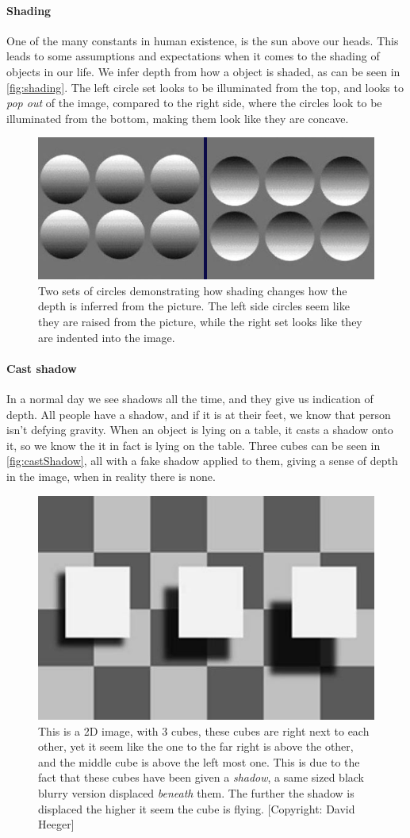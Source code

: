 			\paragraph{Shading}
				One of the many constants in human existence, is the sun above our heads. This leads to some assumptions and expectations when it comes to the shading of objects in our life. We infer depth from how a object is shaded, as can be seen in \autoref{fig:shading}. The left circle set looks to be illuminated from the top, and looks to \textit{pop out} of the image, compared to the right side, where the circles look to be illuminated from the bottom, making them look like they are concave.
				\begin{figure}[H]
					\centering
					\includegraphics[width=0.8\linewidth]{figure/shading}
					\caption{Two sets of circles demonstrating how shading changes how the depth is inferred from the picture. The left side circles seem like they are raised from the picture, while the right set looks like they are indented into the image.}
					\label{fig:shading}
				\end{figure}
			\paragraph{Cast shadow}
				In a normal day we see shadows all the time, and they give us indication of depth. All people have a shadow, and if it is at their feet, we know that person isn't defying gravity. When an object is lying on a table, it casts a shadow onto it, so we know the it in fact is lying on the table. Three cubes can be seen in \autoref{fig:castShadow}, all with a fake shadow applied to them, giving a sense of depth in the image, when in reality there is none.
				\begin{figure}[H]
					\centering
					\includegraphics[width=0.5\linewidth]{figure/castShadow}
					\caption{This is a 2D image, with 3 cubes, these cubes are right next to each other, yet it seem like the one to the far right is above the other, and the middle cube is above the left most one. This is due to the fact that these cubes have been given a \textit{shadow}, a same sized black blurry version displaced \textit{beneath} them. The further the shadow is displaced the higher it seem the cube is flying. [Copyright: David Heeger]}
					\label{fig:castShadow}
				\end{figure}
